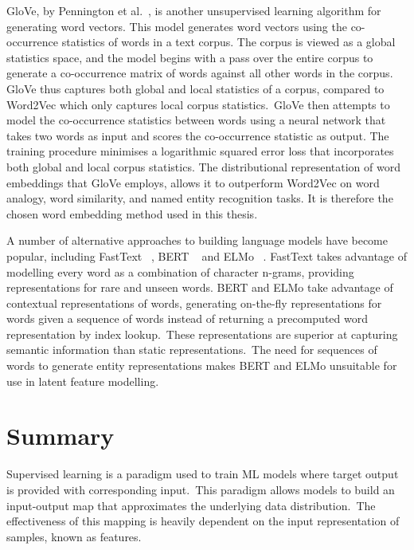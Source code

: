\noindent GloVe, by Pennington et al.\unskip~\citep{pennington2014glove}, is another unsupervised learning algorithm for generating word vectors. This model generates word vectors using the co-occurrence statistics of words in a text corpus. The corpus is viewed as a global statistics space, and the model begins with a pass over the entire corpus to generate a co-occurrence matrix of words against all other words in the corpus. GloVe thus captures both global and local statistics of a corpus, compared to Word2Vec which only captures local corpus statistics.\ GloVe then attempts to model the co-occurrence statistics between words using a neural network that takes two words as input and scores the co-occurrence statistic as output. The training procedure minimises a logarithmic squared error loss that incorporates both global and local corpus statistics. The distributional representation of word embeddings that GloVe employs, allows it to outperform Word2Vec on word analogy, word similarity, and named entity recognition tasks. It is therefore the chosen word embedding method used in this thesis. \par

\noindent A number of alternative approaches to building language models have become popular, including FastText \unskip~\citep{bojanowski2016enriching}, BERT \unskip~\citep{vaswani2017attention} and ELMo \unskip~\citep{peters2018deep}. FastText takes advantage of modelling every word as a combination of character n-grams, providing representations for rare and unseen words. BERT and ELMo take advantage of contextual representations of words, generating on-the-fly representations for words given a sequence of words instead of returning a precomputed word representation by index lookup.\ These representations are superior at capturing semantic information than static representations.\ The need for sequences of words to generate entity representations makes BERT and ELMo unsuitable for use in latent feature modelling.



\section{Summary}

Supervised learning is a paradigm used to train ML models where target output is provided with corresponding input.\ This paradigm allows models to build an input-output map that approximates the underlying data distribution.\ The effectiveness of this mapping is heavily dependent on the input representation of samples, known as features. \par

